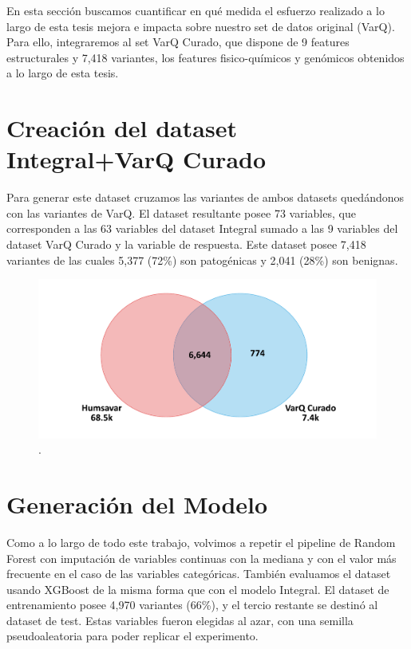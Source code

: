 
En esta sección buscamos cuantificar en qué medida el esfuerzo realizado a lo largo de esta tesis mejora e impacta sobre nuestro set de datos original (VarQ). Para ello, integraremos al set VarQ Curado, que dispone de 9 features estructurales y 7,418 variantes, los features fisico-químicos y genómicos obtenidos a lo largo de esta tesis.

\section{Creación del dataset Integral+VarQ Curado}
Para generar este dataset cruzamos las variantes de ambos datasets quedándonos con las variantes de VarQ. El dataset resultante posee 73 variables, que corresponden a las 63 variables del dataset Integral sumado a las 9 variables del dataset VarQ Curado y la variable de respuesta. Este dataset posee 7,418 variantes de las cuales 5,377 (72\%) son patogénicas y 2,041 (28\%) son benignas. 

\begin{figure}[H]
    \centering
    \includegraphics[scale=0.4]{documents/latex/figures/3/integral_varq/interseccion_varq_integral.pdf}
    \caption{.}
    \label{fig:interseccion_varq_integral}
\end{figure}



\section{Generación del Modelo}
Como a lo largo de todo este trabajo, volvimos a repetir el pipeline de Random Forest con imputación de variables continuas con la mediana y con el valor más frecuente en el caso de las variables categóricas. También evaluamos el dataset usando XGBoost de la misma forma que con el modelo Integral. El dataset de entrenamiento posee 4,970 variantes (66\%), y el tercio restante se destinó al dataset de test. Estas variables fueron elegidas al azar, con una semilla pseudoaleatoria para poder replicar el experimento.  

